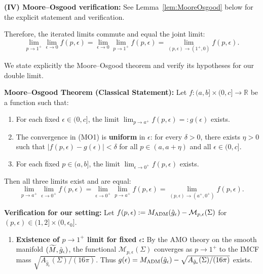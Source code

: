 \begin{theorem}
\textbf{(IV) Moore--Osgood verification:} See Lemma~\ref{lem:MooreOsgood} below for the explicit statement and verification.

Therefore, the iterated limits commute and equal the joint limit:
\begin{equation}
    \lim_{p \to 1^+} \lim_{\epsilon \to 0} f(p, \epsilon) = \lim_{\epsilon \to 0} \lim_{p \to 1^+} f(p, \epsilon) = \lim_{(p,\epsilon) \to (1^+, 0)} f(p, \epsilon).
\end{equation}
\end{theorem}

\begin{lemma}\label{lem:MooreOsgood}
We state explicitly the Moore--Osgood theorem and verify its hypotheses for our double limit.

\textbf{Moore--Osgood Theorem (Classical Statement):} Let $f: (a,b] \times (0, c] \to \mathbb{R}$ be a function such that:
\begin{enumerate}
    \item[(MO1)] For each fixed $\epsilon \in (0, c]$, the limit $\lim_{p \to a^+} f(p, \epsilon) =: g(\epsilon)$ exists.
    \item[(MO2)] The convergence in (MO1) is \textbf{uniform} in $\epsilon$: for every $\delta > 0$, there exists $\eta > 0$ such that $|f(p, \epsilon) - g(\epsilon)| < \delta$ for all $p \in (a, a+\eta)$ and all $\epsilon \in (0, c]$.
    \item[(MO3)] For each fixed $p \in (a, b]$, the limit $\lim_{\epsilon \to 0^+} f(p, \epsilon)$ exists.
\end{enumerate}
Then all three limits exist and are equal:
\[
\lim_{p \to a^+} \lim_{\epsilon \to 0^+} f(p, \epsilon) = \lim_{\epsilon \to 0^+} \lim_{p \to a^+} f(p, \epsilon) = \lim_{(p, \epsilon) \to (a^+, 0^+)} f(p, \epsilon).
\]

\textbf{Verification for our setting:} Let $f(p, \epsilon) := M_{\mathrm{ADM}}(\hat{g}_\epsilon) - \mathcal{M}_{p,\epsilon}(\Sigma)$ for $(p, \epsilon) \in (1, 2] \times (0, \epsilon_0]$.

\begin{enumerate}
    \item[(MO1)] \textbf{Existence of $p \to 1^+$ limit for fixed $\epsilon$:} By the AMO theory on the smooth manifold $(\widetilde{M}, \hat{g}_\epsilon)$, the functional $\mathcal{M}_{p,\epsilon}(\Sigma)$ converges as $p \to 1^+$ to the IMCF mass $\sqrt{A_{\hat{g}_\epsilon}(\Sigma)/(16\pi)}$. Thus $g(\epsilon) = M_{\mathrm{ADM}}(\hat{g}_\epsilon) - \sqrt{A_{\hat{g}_\epsilon}(\Sigma)/(16\pi)}$ exists.
    

\end{enumerate}
\end{lemma}
